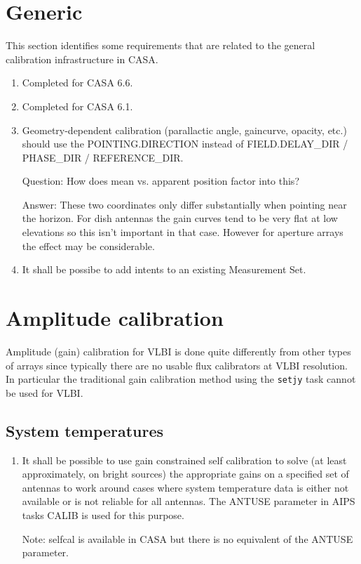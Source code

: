 \documentclass[11pt,a4paper]{article}
\begin{document}
\section{Generic}

This section identifies some requirements that are related to the
general calibration infrastructure in CASA.

\begin{enumerate}[seclist]

\item Completed for CASA 6.6.

\item Completed for CASA 6.1.

\item Geometry-dependent calibration (parallactic angle, gaincurve,
  opacity, etc.) should use the POINTING.DIRECTION instead of
  FIELD.DELAY{\_}DIR / PHASE{\_}DIR / REFERENCE{\_}DIR.

  Question: How does mean vs. apparent position factor into this?

  Answer: These two coordinates only differ substantially when
  pointing near the horizon.  For dish antennas the gain curves tend
  to be very flat at low elevations so this isn't important in that
  case.  However for aperture arrays the effect may be considerable.

\item It shall be possibe to add intents to an existing Measurement Set.
  
\end{enumerate}


\section{Amplitude calibration}

Amplitude (gain) calibration for VLBI is done quite differently from
other types of arrays since typically there are no usable flux
calibrators at VLBI resolution.  In particular the traditional gain
calibration method using the \texttt{setjy} task cannot be used for
VLBI.


\subsection{System temperatures}

\begin{enumerate}[subseclist]

  \item It shall be possible to use gain constrained self calibration
    to solve (at least approximately, on bright sources) the
    appropriate gains on a specified set of antennas to work around
    cases where system temperature data is either not available or is
    not reliable for all antennas. The ANTUSE parameter in AIPS tasks
    CALIB is used for this purpose.

    Note: selfcal is available in CASA but there is no equivalent of
    the ANTUSE parameter.

\end{enumerate}
\end{document}
